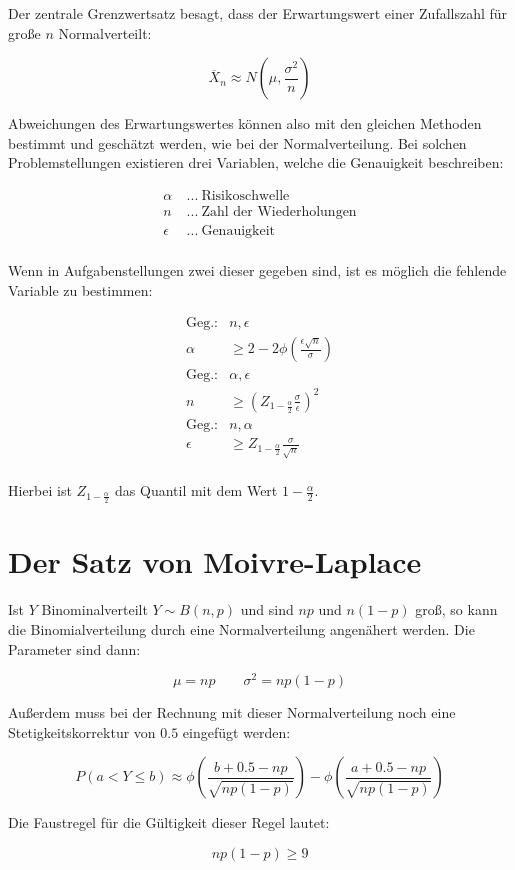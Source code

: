 Der zentrale Grenzwertsatz besagt, dass der Erwartungswert einer Zufallszahl für große $n$ Normalverteilt:

\[\overline{X}_n \approx N(\mu, \frac{\sigma^2}{n})\]

Abweichungen des Erwartungswertes können also mit den gleichen Methoden bestimmt und geschätzt werden, wie bei der Normalverteilung.
Bei solchen Problemstellungen existieren drei Variablen, welche die Genauigkeit beschreiben:

\begin{align*}
  \alpha&\: ...\: \text{Risikoschwelle}\\
  n&\: ...\: \text{Zahl der Wiederholungen}\\
  \epsilon&\: ...\: \text{Genauigkeit}\\
\end{align*}

Wenn in Aufgabenstellungen zwei dieser gegeben sind, ist es möglich die fehlende Variable zu bestimmen:

\begin{align*}
  \text{Geg.:}
  &n, \epsilon\\
  \alpha &\ge 2-2\phi\left(\frac{\epsilon\sqrt{n}}{\sigma}\right)\\
  \text{Geg.:}
  &\alpha, \epsilon\\
  n &\ge \left(Z_{1-\frac{\alpha}{2}}\frac{\sigma}{\epsilon}\right)^2\\
  \text{Geg.:}
  &n, \alpha\\
  \epsilon &\ge Z_{1-\frac{\alpha}{2}}\frac{\sigma}{\sqrt{n}}\\
\end{align*}

Hierbei ist $Z_{1-\frac{\alpha}{2}}$ das Quantil mit dem Wert $1-\frac{\alpha}{2}$.

\section{Der Satz von Moivre-Laplace}

Ist $Y$ Binominalverteilt $Y \sim B(n,p)$ und sind $np$ und $n(1-p)$ groß, so kann die Binomialverteilung durch eine Normalverteilung angenähert werden.
Die Parameter sind dann:

\[\mu = np \qquad \sigma^2=np(1-p)\]

Außerdem muss bei der Rechnung mit dieser Normalverteilung noch eine Stetigkeitskorrektur von $0.5$ eingefügt werden:

\[P(a < Y \le b) \approx 
  \phi\left(\frac{b+\mathbf{0.5}-np}{\sqrt{np(1-p)}}\right) - 
  \phi\left(\frac{a+\mathbf{0.5}-np}{\sqrt{np(1-p)}}\right)\]

Die Faustregel für die Gültigkeit dieser Regel lautet:

\[np(1-p) \ge 9\]

